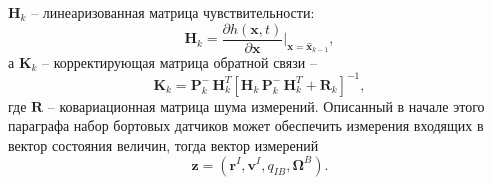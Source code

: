 ${{\bm{H}}_k}$ -- линеаризованная матрица чувствительности:
\begin{equation}
{\bm{H}}_k = \frac{\partial {h}({\bm{x}},t)}{\partial {\bm{x}}} \Bigg|_{\bm x = {{\bm{\hat x}}_{k - 1}}},
\end{equation}
а ${{\bm{K}}_k}$ -- корректирующая матрица обратной связи --
$${{\bm{K}}_k} = {\bm{P}}_k^ - \,{\bm{H}}_k^T{\left[ {{{\bm{H}}_k}\,{\bm{P}}_k^ - \,{\bm{H}}_k^T + {{\bm{R}}_k}} \right]^{ - 1}},$$
где $\bm R$ -- ковариационная матрица шума измерений. Описанный в начале этого параграфа набор бортовых датчиков может обеспечить измерения входящих в вектор состояния величин, тогда вектор измерений
\begin{equation} \label{eq:ekf_state}
\bm z = (\bm r^I, \bm v^I, q_{IB},\bm \Omega^B).
\end{equation}

